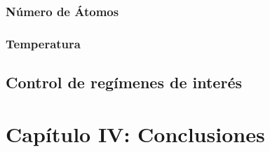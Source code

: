 \documentclass[12pt,twoside]{article}
\begin{document}
\subsubsection{Número de Átomos}\label{na}

\subsubsection{Temperatura}\label{tem}

\subsection{Control de regímenes de interés}\label{regimenes}



\section{Capítulo IV: Conclusiones}\label{Conclusiones}



\newpage


\end{document}
